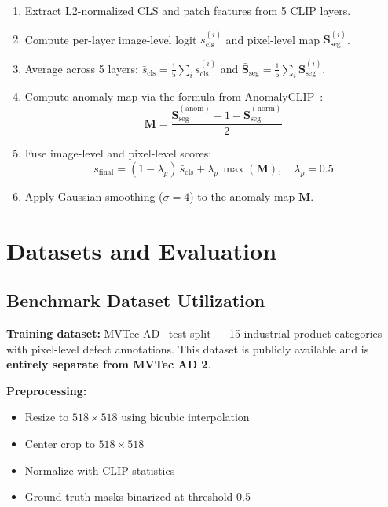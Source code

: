 \documentclass[10pt,twocolumn,letterpaper]{article}
\begin{document}
\begin{enumerate}[nosep]
  \item Extract L2-normalized CLS and patch features from 5 CLIP layers.
  \item Compute per-layer image-level logit $s_{\text{cls}}^{(i)}$ and pixel-level map $\mathbf{S}_{\text{seg}}^{(i)}$.
  \item Average across 5 layers: $\bar{s}_{\text{cls}} = \frac{1}{5}\sum_i s_{\text{cls}}^{(i)}$ and $\bar{\mathbf{S}}_{\text{seg}} = \frac{1}{5}\sum_i \mathbf{S}_{\text{seg}}^{(i)}$.
  \item Compute anomaly map via the formula from AnomalyCLIP~\cite{anomalyclip}:
  \begin{equation}
    \mathbf{M} = \frac{\bar{\mathbf{S}}_{\text{seg}}^{(\text{anom})} + 1 - \bar{\mathbf{S}}_{\text{seg}}^{(\text{norm})}}{2}
  \end{equation}
  \item Fuse image-level and pixel-level scores:
  \begin{equation}
    s_{\text{final}} = (1 - \lambda_p)\, \bar{s}_{\text{cls}} + \lambda_p\, \max(\mathbf{M}), \quad \lambda_p = 0.5
  \end{equation}
  \item Apply Gaussian smoothing ($\sigma = 4$) to the anomaly map $\mathbf{M}$.
\end{enumerate}

\section{Datasets and Evaluation}

\subsection{Benchmark Dataset Utilization}

\textbf{Training dataset:} MVTec AD~\cite{mvtecad} test split --- 15 industrial product categories with pixel-level defect annotations. This dataset is publicly available and is \textbf{entirely separate from MVTec AD 2}.

\textbf{Preprocessing:}
\begin{itemize}[nosep]
  \item Resize to $518 \times 518$ using bicubic interpolation
  \item Center crop to $518 \times 518$
  \item Normalize with CLIP statistics
  \item Ground truth masks binarized at threshold 0.5
\end{itemize}
\end{document}
